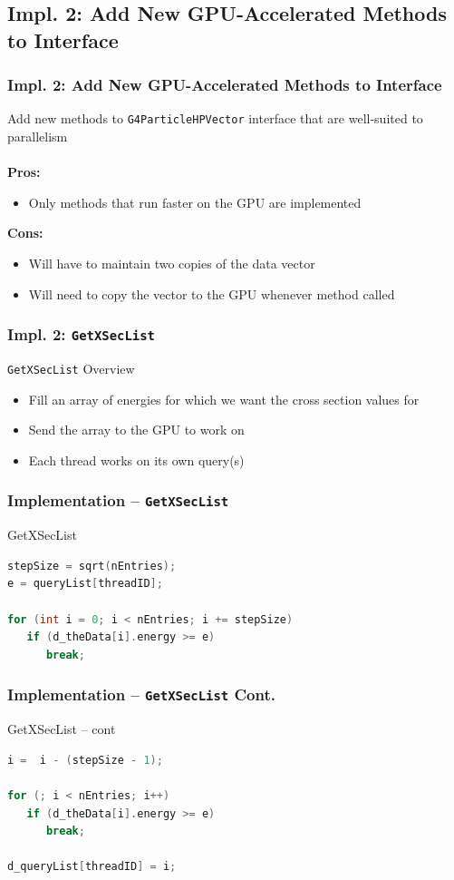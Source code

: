 \documentclass{beamer}
\newcommand\pro{\item[$+$]}
\newcommand\con{\item[$-$]}
\begin{document}
\subsection{Impl. 2: Add New GPU-Accelerated Methods to Interface}
\begin{frame}
\frametitle{Impl. 2: Add New GPU-Accelerated Methods to Interface}
Add new methods to \texttt{G4ParticleHPVector} interface that are well-suited to parallelism\\~\\

\textbf{Pros:}
\begin{itemize}
\pro Only methods that run faster on the GPU are implemented
\end{itemize}

\textbf{Cons:}
\begin{itemize}
\con Will have to maintain two copies of the data vector
\con Will need to copy the vector to the GPU whenever method called
\end{itemize}
\end{frame}

\begin{frame}
\frametitle{Impl. 2: \texttt{GetXSecList}}
\texttt{GetXSecList} Overview
\begin{itemize}
\item Fill an array of energies for which we want the cross section values for
\item Send the array to the GPU to work on
\item Each thread works on its own query(s)
\end{itemize}
\end{frame}

\begin{frame}[fragile]
\frametitle{Implementation -- \texttt{GetXSecList}}
\begin{block}{GetXSecList}
\begin{lstlisting}[language=C++,basicstyle=\ttfamily,keywordstyle=\color{red}]
stepSize = sqrt(nEntries);
e = queryList[threadID];
    
for (int i = 0; i < nEntries; i += stepSize) 
   if (d_theData[i].energy >= e) 
      break;
\end{lstlisting}
\end{block}
\end{frame}

\begin{frame}[fragile]
\frametitle{Implementation -- \texttt{GetXSecList} Cont.}
\begin{block}{GetXSecList -- cont}
\begin{lstlisting}[language=C++, basicstyle=\ttfamily, keywordstyle=\color{red}]
i =  i - (stepSize - 1); 

for (; i < nEntries; i++) 
   if (d_theData[i].energy >= e) 
      break;
   
d_queryList[threadID] = i;
\end{lstlisting}
\end{block}
\end{frame}
\end{document}
